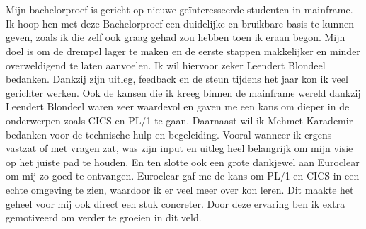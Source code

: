 
\chapter*{}%
\label{ch:voorwoord}


Mijn bachelorproef is gericht op nieuwe geïnteresseerde studenten in mainframe.
Ik hoop hen met deze Bachelorproef een duidelijke en bruikbare basis te kunnen geven, 
zoals ik die zelf ook graag gehad zou hebben toen ik eraan begon. 
Mijn doel is om de drempel lager te maken en de eerste stappen makkelijker en minder overweldigend te laten aanvoelen.
Ik wil hiervoor zeker Leendert Blondeel bedanken. Dankzij zijn uitleg, feedback en de steun tijdens het jaar kon ik veel gerichter werken.
Ook de kansen die ik kreeg binnen de mainframe wereld dankzij Leendert Blondeel waren zeer waardevol en gaven me een kans om dieper in de onderwerpen zoals CICS en PL/1 te gaan.
Daarnaast wil ik Mehmet Karademir bedanken voor de technische hulp en begeleiding. 
Vooral wanneer ik ergens vastzat of met vragen zat, was zijn input en uitleg heel belangrijk om mijn visie op het juiste pad te houden.
En ten slotte ook een grote dankjewel aan Euroclear om mij zo goed te ontvangen. 
Euroclear gaf me de kans om PL/1 en CICS in een echte omgeving te zien, waardoor ik er veel meer over kon leren.
Dit maakte het geheel voor mij ook direct een stuk concreter.
Door deze ervaring ben ik extra gemotiveerd om verder te groeien in dit veld.